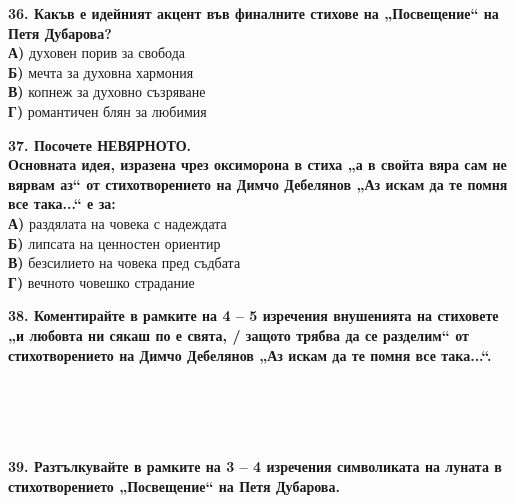\documentclass[12pt,a4paper]{article}
\begin{document}
\vspace{0.6cm}

\noindent
\textbf{36. Какъв е идейният акцент във финалните стихове на „Посвещение“ на Петя Дубарова?}  \\
\noindent
\textbf{А)} духовен порив за свобода \\
\textbf{Б)} мечта за духовна хармония \\
\textbf{В)} копнеж за духовно съзряване \\
\textbf{Г)} романтичен блян за любимия

\vspace{0.6cm}

\noindent
\textbf{37. Посочете НЕВЯРНОТО.} \\
\textbf{Основната идея, изразена чрез оксиморона в стиха „а в свойта вяра сам не вярвам аз“ от стихотворението на Димчо Дебелянов „Аз искам да те помня все така...“ е за:} \\
\noindent
\textbf{А)} раздялата на човека с надеждата \\
\textbf{Б)} липсата на ценностен ориентир \\
\textbf{В)} безсилието на човека пред съдбата \\
\textbf{Г)} вечното човешко страдание

\vspace{0.6cm}

\noindent
\textbf{38. Коментирайте в рамките на 4 – 5 изречения внушенията на стиховете „и любовта ни сякаш по е свята, / защото трябва да се разделим“ от стихотворението на Димчо Дебелянов „Аз искам да те помня все така...“.} \\
\noindent
\makebox[\textwidth]{\dotfill} \\
\makebox[\textwidth]{\dotfill} \\
\makebox[\textwidth]{\dotfill} \\
\makebox[\textwidth]{\dotfill} \\
\makebox[\textwidth]{\dotfill}

\vspace{0.6cm}

\noindent
\textbf{39. Разтълкувайте в рамките на 3 – 4 изречения символиката на луната в стихотворението „Посвещение“ на Петя Дубарова.} \\
\noindent
\makebox[\textwidth]{\dotfill} \\
\makebox[\textwidth]{\dotfill} \\
\makebox[\textwidth]{\dotfill} \\
\makebox[\textwidth]{\dotfill}
\end{document}
